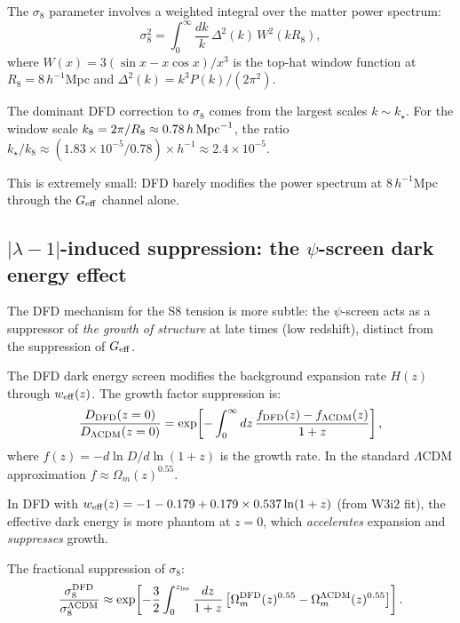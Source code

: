 \documentclass[11pt]{article}
\newcommand{\ee}[1]{\times 10^{#1}}
\newcommand{\lambdaone}{|\lambda-1|}
\newcommand{\DFD}{{\rm DFD}}
\newcommand{\LCDM}{\Lambda{\rm CDM}}
\begin{document}
The $\sigma_8$ parameter involves a weighted integral over the matter
power spectrum:
\begin{equation}
  \sigma_8^2 = \int_0^\infty \frac{dk}{k}\,\Delta^2(k)\,W^2(k R_8),
\end{equation}
where $W(x) = 3(\sin x - x\cos x)/x^3$ is the top-hat window function at
$R_8 = 8\,h^{-1}$Mpc and $\Delta^2(k) = k^3 P(k)/(2\pi^2)$.

The dominant DFD correction to $\sigma_8$ comes from the largest scales
$k \sim k_\star$.  For the window scale $k_8 = 2\pi/R_8 \approx 0.78\,h\,{\rm Mpc}^{-1}$,
the ratio $k_\star/k_8 \approx (1.83\ee{-5}/0.78)\times h^{-1} \approx 2.4\ee{-5}$.

This is extremely small: DFD barely modifies the power spectrum at $8\,h^{-1}$Mpc
through the $G_{\rm eff}$ channel alone.

\subsection{$\lambdaone$-induced suppression: the $\psi$-screen dark energy effect}

The DFD mechanism for the S8 tension is more subtle: the $\psi$-screen
acts as a suppressor of \emph{the growth of structure} at late times
(low redshift), distinct from the suppression of $G_{\rm eff}$.

The DFD dark energy screen modifies the background expansion rate
$H(z)$ through $w_{\rm eff}(z)$.  The growth factor suppression is:
\begin{equation}
  \frac{D_\DFD(z=0)}{D_{\LCDM}(z=0)}
  = \exp\!\left[-\int_0^\infty dz\,\frac{f_\DFD(z) - f_{\LCDM}(z)}{1+z}\right],
\end{equation}
where $f(z) = -d\ln D/d\ln(1+z)$ is the growth rate.  In the standard
$\Lambda$CDM approximation $f \approx \Omega_m(z)^{0.55}$.

In DFD with $w_{\rm eff}(z) = -1 - 0.179 + 0.179\times 0.537\ln(1+z)$
(from W3i2 fit), the effective dark energy is more phantom at $z = 0$,
which \emph{accelerates} expansion and \emph{suppresses} growth.

The fractional suppression of $\sigma_8$:
\begin{equation}\label{eq:s8-suppression}
  \frac{\sigma_8^\DFD}{\sigma_8^{\LCDM}}
  \approx \exp\!\left[-\frac{3}{2}\int_0^{z_{\rm lss}}\frac{dz}{1+z}
  \left[\Omega_m^\DFD(z)^{0.55} - \Omega_m^{\LCDM}(z)^{0.55}\right]\right].
\end{equation}
\end{document}
